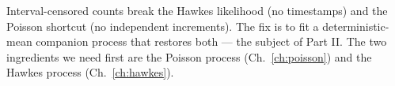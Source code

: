 \begin{recap}
Interval-censored counts break the Hawkes likelihood (no timestamps) and the
Poisson shortcut (no independent increments). The fix is to fit a deterministic-mean
companion process that restores both --- the subject of Part II. The two ingredients
we need first are the Poisson process (Ch.~\ref{ch:poisson}) and the Hawkes process
(Ch.~\ref{ch:hawkes}).
\end{recap}

